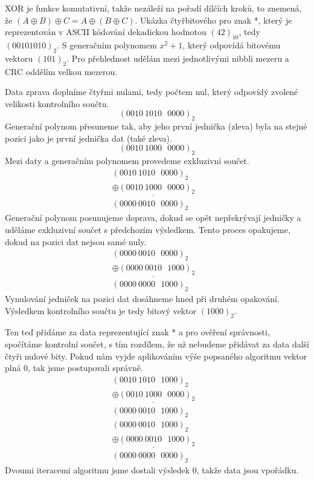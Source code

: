  XOR je funkce komutativní, takže nezáleží na pořadí dílčích kroků, to znemená, že $(A \oplus B) \oplus C = A \oplus (B \oplus C)$.
\newline\newline
Ukázka čtyřbitového  pro znak *, který je reprezentován v ASCII kódování dekadickou hodnotou $(42)_{10}$, tedy $(00101010)_2$. S generačním polynomem $x^2+1$, který odpovídá bitovému vektoru $(101)_2$. Pro přehlednost udělám mezi jednotlivými nibbli mezeru a CRC oddělím velkou mezerou.

Data zprava doplníme čtyřmi nulami, tedy počtem nul, který odpovídý zvolené velikosti kontrolního součtu.
$$ (0010~1010~~~0000)_2 $$
Generační polynom přesuneme tak, aby jeho první jednička (zleva) byla na stejné pozici jako je první jednička dat (také zleva).
$$ (0010~1000~~~0000)_2 $$
Mezi daty a generačním polynomem provedeme exkluzivní součet.
\begin{eqnarray}
    (0010~1010~~~0000)_2  & \nonumber\\\underline{\oplus
    (0010~1000~~~0000)_2} & \nonumber\\
    (0000~0010~~~0000)_2  & \nonumber
\end{eqnarray}
Generační polynom posunujeme doprava, dokud se opět nepřekrývají jedničky a uděláme exkluzivní součet s předchozím výsledkem. Tento proces opakujeme, dokud na pozici dat nejsou samé nuly.
\begin{eqnarray}
    (0000~0010~~~0000)_2  & \nonumber\\\underline{\oplus
    (0000~0010~~~1000)_2} & \nonumber\\
    (0000~0000~~~1000)_2  & \nonumber
\end{eqnarray}
Vynulování jedniček na pozici dat dosáhneme hned při druhém opakování. Výsledkem kontrolního součtu je tedy bitový vektor $(1000)_2$.

Ten teď přidáme za data reprezentující znak * a pro ověření správnosti, spočítáme kontrolní součet, s tím rozdílem, že už nebudeme přidávat za data další čtyři nulové bity. Pokud nám vyjde aplikováním výše popsaného algoritmu vektor plná 0, tak jsme postupovali správně.
\begin{eqnarray}
    (0010~1010~~~1000)_2  & \nonumber\\\underline{\oplus
    (0010~1000~~~0000)_2} & \nonumber\\
    (0000~0010~~~1000)_2  & \nonumber
\end{eqnarray}
\begin{eqnarray}
    (0000~0010~~~1000)_2  & \nonumber\\\underline{\oplus
    (0000~0010~~~1000)_2} & \nonumber\\
    (0000~0000~~~0000)_2  & \nonumber
\end{eqnarray}
Dvoumi iteracemi algoritmu jsme dostali výsledek 0, takže data jsou vpořádku.
